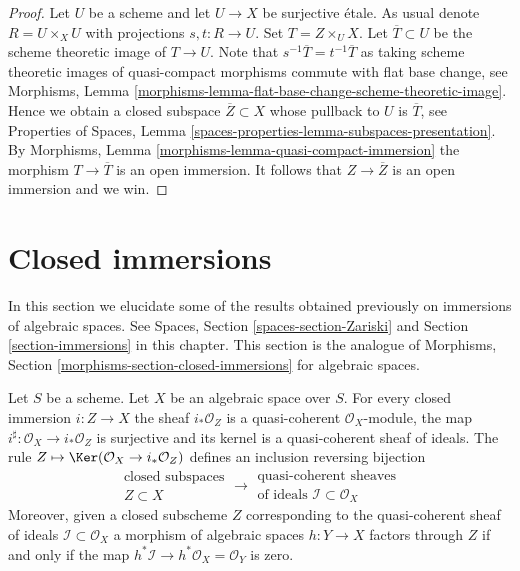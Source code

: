 \begin{proof}
Let $U$ be a scheme and let $U \to X$ be surjective \'etale.
As usual denote $R = U \times_X U$ with projections
$s, t : R \to U$. Set $T = Z \times_U X$. Let $\overline{T} \subset U$
be the scheme theoretic image of $T \to U$. Note that
$s^{-1}\overline{T} = t^{-1}\overline{T}$ as taking
scheme theoretic images of quasi-compact morphisms commute
with flat base change, see
Morphisms, Lemma \ref{morphisms-lemma-flat-base-change-scheme-theoretic-image}.
Hence we obtain a closed subspace $\overline{Z} \subset X$ whose
pullback to $U$ is $\overline{T}$, see
Properties of Spaces, Lemma
\ref{spaces-properties-lemma-subspaces-presentation}.
By Morphisms, Lemma \ref{morphisms-lemma-quasi-compact-immersion}
the morphism $T \to \overline{T}$
is an open immersion. It follows that $Z \to \overline{Z}$ is
an open immersion and we win.
\end{proof}


















\section{Closed immersions}
\label{section-closed-immersions}

\noindent
In this section we elucidate some of the results obtained previously on
immersions of algebraic spaces. See
Spaces, Section \ref{spaces-section-Zariski}
and
Section \ref{section-immersions} in this chapter.
This section is the analogue of
Morphisms, Section \ref{morphisms-section-closed-immersions}
for algebraic spaces.

\begin{lemma}
\label{lemma-closed-immersion-ideals}
Let $S$ be a scheme.
Let $X$ be an algebraic space over $S$.
For every closed immersion $i : Z \to X$ the sheaf
$i_*\mathcal{O}_Z$ is a quasi-coherent $\mathcal{O}_X$-module, the map
$i^\sharp : \mathcal{O}_X \to i_*\mathcal{O}_Z$ is surjective and its
kernel is a quasi-coherent sheaf of ideals. The rule
$Z \mapsto \Ker(\mathcal{O}_X \to i_*\mathcal{O}_Z)$
defines an inclusion reversing bijection
$$
\begin{matrix}
\text{closed subspaces}\\
Z \subset X
\end{matrix}
\longrightarrow
\begin{matrix}
\text{quasi-coherent sheaves}\\
\text{of ideals }\mathcal{I} \subset \mathcal{O}_X
\end{matrix}
$$
Moreover, given a closed subscheme $Z$ corresponding to the quasi-coherent
sheaf of ideals $\mathcal{I} \subset \mathcal{O}_X$ a morphism of algebraic
spaces $h : Y \to X$ factors through $Z$ if and only if the map
$h^*\mathcal{I} \to h^*\mathcal{O}_X = \mathcal{O}_Y$ is zero.
\end{lemma}

